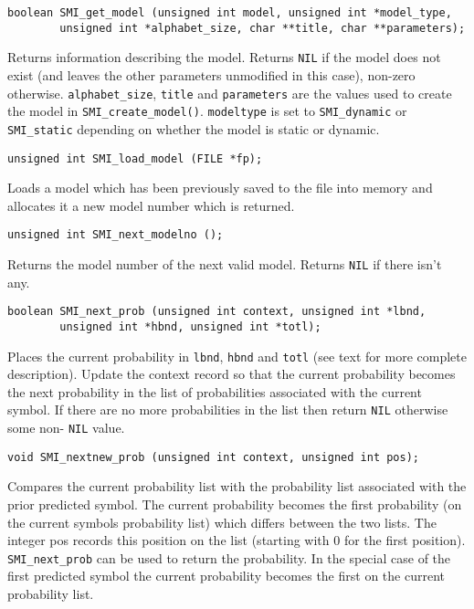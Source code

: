 \documentclass[11pt]{article}
\begin{document}
{\begin{verbatim}
boolean SMI_get_model (unsigned int model, unsigned int *model_type,
        unsigned int *alphabet_size, char **title, char **parameters);
\end{verbatim}

\vspace{-0.2cm}
Returns information describing the model. Returns \verb|NIL| if the model
does not exist (and leaves the other parameters unmodified in this case),
non-zero otherwise.  \verb|alphabet_size|, \verb|title| and
\verb|parameters| are the values used to create the model in
\verb|SMI_create_model()|. \verb|modeltype| is set to \verb|SMI_dynamic|
or \verb|SMI_static| depending on whether the model is static or dynamic.

\begin{verbatim}
unsigned int SMI_load_model (FILE *fp);
\end{verbatim}

\vspace{-0.2cm}
Loads a model which has been previously saved to the file into memory and
allocates it a new model number which is returned.

\begin{verbatim}
unsigned int SMI_next_modelno ();
\end{verbatim}

Returns the model number of the next valid model. Returns \verb|NIL| if
there isn't any.

\begin{verbatim}
boolean SMI_next_prob (unsigned int context, unsigned int *lbnd,
        unsigned int *hbnd, unsigned int *totl);
\end{verbatim}

\vspace{-0.2cm}
Places the current probability in \verb|lbnd|, \verb|hbnd| and \verb|totl|
(see text for more complete description). Update the context record so
that the current probability becomes the next probability in the list of
probabilities associated with the current symbol. If there are no more
probabilities in the list then return \verb|NIL| otherwise some non-%
\verb|NIL| value.

\begin{verbatim}
void SMI_nextnew_prob (unsigned int context, unsigned int pos);
\end{verbatim}

\vspace{-0.2cm}
Compares the current probability list with the probability list associated
with the prior predicted symbol. The current probability becomes the first
probability (on the current symbols probability list) which differs between
the two lists. The integer pos records this position on the list (starting
with 0 for the first position). \verb|SMI_next_prob| can be used to return
the probability. In the special case of the first predicted symbol the
current probability becomes the first on the current probability list.

}
\end{document}
